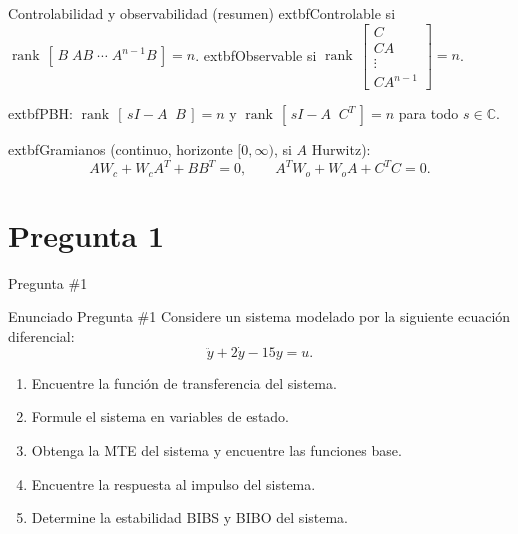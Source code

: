 \documentclass[
    10pt,
    aspectratio=169,
    xcolor={dvipsnames},
    spanish,
    ]{beamer}
\begin{document}
\begin{frame}{Controlabilidad y observabilidad (resumen)}
\footnotesize
	extbf{Controlable} si $\operatorname{rank}\,[\,B\;AB\;\cdots\;A^{n-1}B\,]=n$. \quad
	extbf{Observable} si $\operatorname{rank}\,\begin{bmatrix}C\\ CA\\ \vdots \\ CA^{n-1}\end{bmatrix}=n$.

\medskip
	extbf{PBH}: $\operatorname{rank}\,[\,sI-A\;\;B\,]=n$ y $\operatorname{rank}\,[\,sI-A\;\;C^T\,]=n$ para todo $s\in\mathbb{C}$.

\medskip
	extbf{Gramianos} (continuo, horizonte $[0,\infty)$, si $A$ Hurwitz):
\[A W_c+W_c A^T+BB^T=0,\qquad A^T W_o+W_o A+C^T C=0.\]
\end{frame}



\section{Pregunta 1}
\begin{frame}{Pregunta \#1}
\begin{block}{Enunciado Pregunta \#1}
Considere un sistema modelado por la siguiente ecuación diferencial:
  \begin{equation}
    \ddot y + 2\dot y - 15 y = u.
  \end{equation}

  \begin{enumerate}
    \item Encuentre la función de transferencia del sistema.
    \item Formule el sistema en variables de estado.
    \item Obtenga la MTE del sistema y encuentre las funciones base.
    \item Encuentre la respuesta al impulso del sistema.
    \item Determine la estabilidad BIBS y BIBO del sistema.
  \end{enumerate}
\end{block}
\end{frame}
\end{document}
